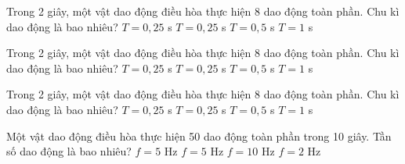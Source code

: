 \begin{ex}
Trong 2 giây, một vật dao động điều hòa thực hiện 8 dao động toàn phần. Chu kì dao động là bao nhiêu?
\choice
{$T = 0{,}25$ s}
{\True $T = 0{,}25$ s}
{$T = 0{,}5$ s}
{$T = 1$ s}
\end{ex}

\begin{ex}
Trong 2 giây, một vật dao động điều hòa thực hiện 8 dao động toàn phần. Chu kì dao động là bao nhiêu?
\choice
{$T = 0{,}25$ s}
{\True $T = 0{,}25$ s}
{$T = 0{,}5$ s}
{$T = 1$ s}
\end{ex}

\begin{ex}
Trong 2 giây, một vật dao động điều hòa thực hiện 8 dao động toàn phần. Chu kì dao động là bao nhiêu?
\choice
{$T = 0{,}25$ s}
{\True $T = 0{,}25$ s}
{$T = 0{,}5$ s}
{$T = 1$ s}
\end{ex}

\begin{ex}
Một vật dao động điều hòa thực hiện 50 dao động toàn phần trong 10 giây. Tần số dao động là bao nhiêu?
\choice
{$f = 5$ Hz}
{\True $f = 5$ Hz}
{$f = 10$ Hz}
{$f = 2$ Hz}
\end{ex}

